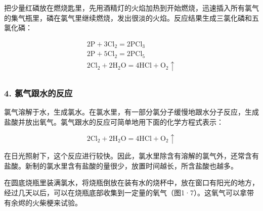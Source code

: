 把少量红磷放在燃烧匙里，先用酒精灯的火焰加热到开始燃烧，迅速插入所有氯气的集气瓶里，磷在氯气里继续燃烧，发出很淡的火焰。反应结果生成三氯化磷和五氯化磷：

\[
\begin{array}{l} 2 \mathrm{P} + 3 \mathrm{Cl} _ {2} = 2 \mathrm{PCl} _ {3} \\ 2 \mathrm{P} + 5 \mathrm{Cl} _ {2} = 2 \mathrm{PCl} _ {5} \\ 2 \mathrm{Cl} _ {2} + 2 \mathrm{H} _ {2} \mathrm{O} = 4 \mathrm{HCl} + \mathrm{O} _ {2} \uparrow \\ \end{array}
\]

\subsubsection{4. 氯气跟水的反应}

氯气溶解于水，生成氯水。在氯水里，有一部分氯分子缓慢地跟水分子反应，生成盐酸并放出氧气。氯气跟水的反应可简单地用下面的化学方程式表示：

\[
2 \mathrm{Cl} _ {2} + 2 \mathrm{H} _ {2} \mathrm{O} = 4 \mathrm{HCl} + \mathrm{O} _ {2} \uparrow
\]

在日光照射下，这个反应进行较快。因此，氯水里除含有溶解的氯气外，还常含有盐酸。新制的氯水里含有盐酸的量很少，放置时间越长，所含盐酸也越多。

在圆底烧瓶里装满氯水，将烧瓶倒放在装有水的烧杯中，放在窗口有阳光的地方，经过几天以后，可以在烧瓶底部收集到一定量的氧气（图1·7）。这氧气可以拿带有余烬的火柴梗来试验。


